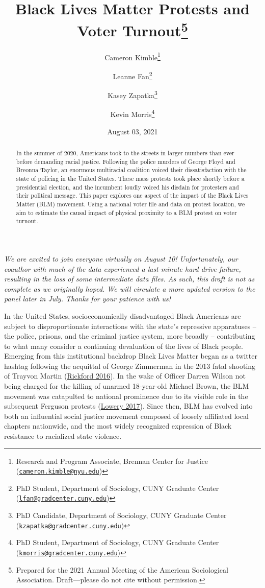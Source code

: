 \documentclass[
  12pt,
]{article}
\title{Black Lives Matter Protests and Voter Turnout\thanks{Prepared for the 2021 Annual Meeting of the American Sociological Association. Draft---please do not cite without permission.}}
\author{Cameron Kimble\footnote{Research and Program Associate, Brennan Center for Justice (\href{mailto:cameron.kimble@nyu.edu}{\nolinkurl{cameron.kimble@nyu.edu}})} \and Leanne Fan\footnote{PhD Student, Department of Sociology, CUNY Graduate Center (\href{mailto:lfan@gradcenter.cuny.edu}{\nolinkurl{lfan@gradcenter.cuny.edu}})} \and Kasey Zapatka\footnote{PhD Candidate, Department of Sociology, CUNY Graduate Center (\href{mailto:kzapatka@gradcenter.cuny.edu}{\nolinkurl{kzapatka@gradcenter.cuny.edu}})} \and Kevin Morris\footnote{PhD Student, Department of Sociology, CUNY Graduate Center (\href{mailto:kmorris@gradcenter.cuny.edu}{\nolinkurl{kmorris@gradcenter.cuny.edu}})}}
\date{August 03, 2021}
\begin{document}
\maketitle
\begin{abstract}
In the summer of 2020, Americans took to the streets in larger numbers than ever before demanding racial justice. Following the police murders of George Floyd and Breonna Taylor, an enormous multiracial coalition voiced their dissatisfaction with the state of policing in the United States. These mass protests took place shortly before a presidential election, and the incumbent loudly voiced his disdain for protesters and their political message. This paper explores one aspect of the impact of the Black Lives Matter (BLM) movement. Using a national voter file and data on protest location, we aim to estimate the causal impact of physical proximity to a BLM protest on voter turnout.
\end{abstract}

\pagebreak
\doublespacing


\emph{We are excited to join everyone virtually on August 10! Unfortunately, our coauthor with much of the data experienced a last-minute hard drive failure, resulting in the loss of some intermediate data files. As such, this draft is not as complete as we originally hoped. We will circulate a more updated version to the panel later in July. Thanks for your patience with us!}

In the United States, socioeconomically disadvantaged Black Americans are subject to disproportionate interactions with the state's repressive apparatuses -- the police, prisons, and the criminal justice system, more broadly -- contributing to what many consider a continuing devaluation of the lives of Black people. Emerging from this institutional backdrop Black Lives Matter began as a twitter hashtag following the acquittal of George Zimmerman in the 2013 fatal shooting of Trayvon Martin (\protect\hyperlink{ref-Rickford2016}{Rickford 2016}). In the wake of Officer Darren Wilson not being charged for the killing of unarmed 18-year-old Michael Brown, the BLM movement was catapulted to national prominence due to its visible role in the subsequent Ferguson protests (\protect\hyperlink{ref-Lowery2017}{Lowery 2017}). Since then, BLM has evolved into both an influential social justice movement composed of loosely affiliated local chapters nationwide, and the most widely recognized expression of Black resistance to racialized state violence.
\end{document}
